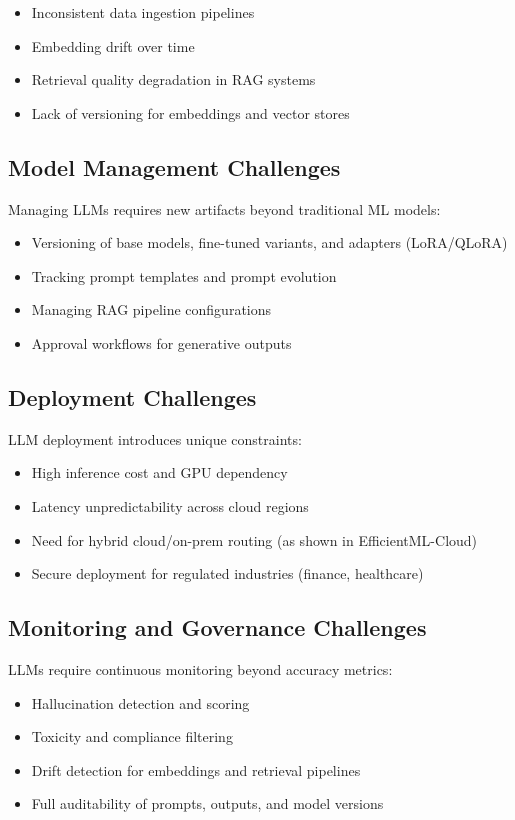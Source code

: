 \documentclass[11pt]{article}
\begin{document}
\begin{itemize}[leftmargin=1.2cm]
    \item Inconsistent data ingestion pipelines
    \item Embedding drift over time
    \item Retrieval quality degradation in RAG systems
    \item Lack of versioning for embeddings and vector stores
\end{itemize}

\subsection{Model Management Challenges}
Managing LLMs requires new artifacts beyond traditional ML models:

\begin{itemize}[leftmargin=1.2cm]
    \item Versioning of base models, fine-tuned variants, and adapters (LoRA/QLoRA)
    \item Tracking prompt templates and prompt evolution
    \item Managing RAG pipeline configurations
    \item Approval workflows for generative outputs
\end{itemize}

\subsection{Deployment Challenges}
LLM deployment introduces unique constraints:

\begin{itemize}[leftmargin=1.2cm]
    \item High inference cost and GPU dependency
    \item Latency unpredictability across cloud regions
    \item Need for hybrid cloud/on-prem routing (as shown in EfficientML-Cloud)
    \item Secure deployment for regulated industries (finance, healthcare)
\end{itemize}

\subsection{Monitoring and Governance Challenges}
LLMs require continuous monitoring beyond accuracy metrics:

\begin{itemize}[leftmargin=1.2cm]
    \item Hallucination detection and scoring
    \item Toxicity and compliance filtering
    \item Drift detection for embeddings and retrieval pipelines
    \item Full auditability of prompts, outputs, and model versions
\end{itemize}
\end{document}
